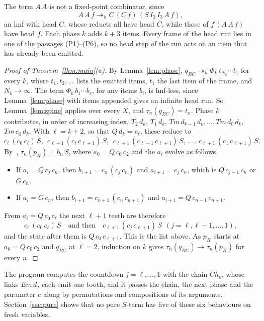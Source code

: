 \documentclass[11pt]{amsart}
\theoremstyle{definition}
\newcommand{\red}{\twoheadrightarrow}
\newcommand{\hred}{\twoheadrightarrow_h}
\newcommand{\pK}{p_K}
\newcommand{\qBC}{q_{BC}}
\newcommand{\Ir}{I_3}
\newcommand{\Em}{\mathit{Em}}
\newcommand{\Tem}{\mathit{Tm}}
\newcommand{\Ch}{\mathit{Ch}}
\begin{document}
The term $A\,A$ is not a fixed-point combinator, since
\[
A\,A\,f\hred C\,(C\,f)\,(S\,\Ir\,\Ir\,A\,f),
\]
an hnf with head $C$, whose reducts all have head $C$, while those of $f\,(A\,A\,f)$ have head $f$. Each phase
$k$ adds $k+3$ items. Every frame of the head run lies in one of the passages (P1)--(P6), so no head
step of the run acts on an item that has already been emitted.

\begin{proof}[Proof of Theorem~\ref{thm:main}\textup{(a)}]
By Lemma~\ref{lem:phase}, $\qBC\hred\Phi_k\,t_{N_k}\cdots t_1$ for every $k$, where $t_1,t_2,\dots$ lists
the emitted items, $t_1$ the last item of the frame, and $N_k\to\infty$. The term $\Phi_k\,b_1\cdots b_r$,
for any items $b_i$, is hnf-less, since Lemma~\ref{lem:phase} with items appended gives an infinite head
run. So Lemma~\ref{lem:spine} applies over every $X$, and $\tau_n(\qBC)=t_n$. Phase $k$ contributes, in
order of increasing index, $T_2\,d_k$, $T_1\,d_k$, $\Tem\,d_{k-1}\,d_k,\dots,\Tem\,d_0\,d_k$, $\Tem\,c_0\,d_k$.
With $\ell=k+2$, so that $Q\,d_k=c_\ell$, these reduce to
\[
c_\ell\,(c_0\,c_\ell)\,S,\ \ c_{\ell+1}\,(c_\ell\,c_{\ell+1})\,S,\ \ c_{\ell+1}\,(c_{\ell-1}\,c_{\ell+1})\,S,\ \dots,\
c_{\ell+1}\,(c_1\,c_{\ell+1})\,S.
\]
By~\citep[\S3]{s11}, $\tau_n(\pK)=b_n\,S$, where $a_0=Q\,c_0\,c_2$ and the $a_i$ evolve as follows.
\begin{itemize}
\item If $a_i=Q\,c_j\,c_n$, then $b_{i+1}=c_n\,(c_j\,c_n)$ and $a_{i+1}=c_j\,c_n$, which is
$Q\,c_{j-1}\,c_n$ or $G\,c_n$.
\item If $a_i=G\,c_n$, then $b_{i+1}=c_{n+1}\,(c_n\,c_{n+1})$ and $a_{i+1}=Q\,c_{n-1}\,c_{n+1}$.
\end{itemize}
From $a_i=Q\,c_0\,c_\ell$ the next $\ell+1$ teeth are therefore
\[
c_\ell\,(c_0\,c_\ell)\,S\quad\text{and then}\quad c_{\ell+1}\,(c_j\,c_{\ell+1})\,S\ \ (j=\ell,\ell-1,\dots,1),
\]
and the state after them is $Q\,c_0\,c_{\ell+1}$.
 This is the list above. As $\pK$ starts at $a_0=Q\,c_0\,c_2$ and $\qBC$ at $\ell=2$,
induction on $k$ gives $\tau_n(\qBC)\red\tau_n(\pK)$ for every $n$.
\end{proof}

The program computes the countdown $j=\ell,\dots,1$ with the chain $\Ch_k$, whose links $\Em\,d_j$ each
emit one tooth, and it passes the chain, the next phase and the parameter $e$ along by permutations and
compositions of its arguments. Section~\ref{sec:pure} shows that no pure $S$-term has five of these six
behaviours on fresh variables.
\end{document}
